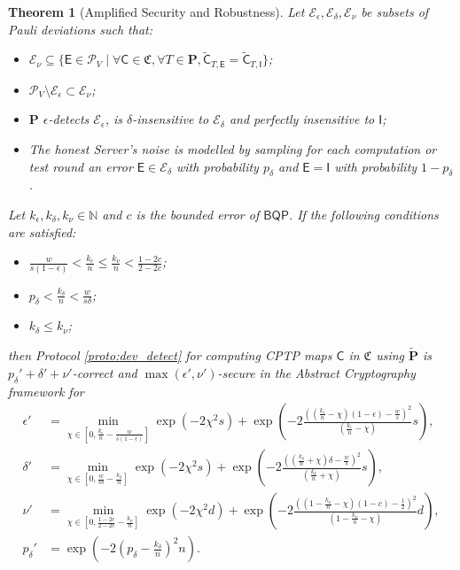 \documentclass[12pt]{iopart}
\newcommand{\cptp}[1]{\mathsf{#1}} \newcommand{\pd}[1]{\mathcal{#1}}  \newcommand{\sch}[1]{\bm{#1}}
\newcommand{\Id}{\cptp{I}}
\renewcommand{\1}{\mathds{1}}
\newcommand{\Cdev}[1]{\tilde{\cptp C}_{T, #1}}
\newtheorem{theorem}{Theorem}
\begin{document}
\begin{theorem}[Amplified Security and Robustness]
\noindent Let $\mathcal E_\epsilon, \mathcal E_\delta, \mathcal{E}_\nu$ be subsets of Pauli deviations such that:
  \begin{itemize}
  \item $\mathcal{E}_\nu \subseteq \{\cptp E \in \mathcal{P}_V \mid \forall \cptp C \in \mathfrak{C}, \forall T \in \sch P, \Cdev{\cptp E} = \Cdev{\cptp \Id}\}$;
  \item $\mathcal{P}_V \setminus \mathcal E_\epsilon \subset \mathcal{E}_\nu$;
  \item $\sch P$ $\epsilon$-detects $\mathcal E_\epsilon$, is $\delta$-insensitive to $\mathcal E_\delta$ and perfectly insensitive to $\Id$;
  \item The honest Server's noise is modelled by sampling for each computation or test round an error $\cptp E \in \mathcal E_\delta$ with probability $p_\delta$ and $\cptp E = \Id$ with probability $1 - p_\delta$. 
  \end{itemize}
  Let $k_\epsilon, k_\delta, k_\nu \in \mathbb{N}$ and $c$ is the bounded error of $\mathsf{BQP}$. If the following conditions are satisfied:
  \begin{itemize}
  \item $\frac{w}{s(1 - \epsilon)} < \frac{k_\epsilon}{n} \leq \frac{k_\nu}{n} < \frac{1 - 2c}{2 - 2c}$;
  \item $p_\delta < \frac{k_\delta}{n} < \frac{w}{s\delta}$;
  \item $k_\delta \leq k_\nu$;
  \end{itemize}
  then Protocol \ref{proto:dev_detect} for computing CPTP maps $\cptp C$ in $\mathfrak C$ using $\tilde{\sch P}$ is $p_\delta' + \delta' + \nu'$-correct and $\max(\epsilon', \nu')$-secure in the Abstract Cryptography framework for
  \begin{align}
  	\epsilon' &= \min_{\chi \in \left[ 0, \frac{k_\epsilon}{n} - \frac{w}{s(1-\epsilon)} \right]} \exp \left( -2 \chi^2 s \right) + \exp \left( -2 \frac{\left(\left( \frac{k_\epsilon}{n} - \chi \right)(1-\epsilon) - \frac{w}{s}\right)^2}{\left( \frac{k_\epsilon}{n} - \chi \right)} s\right),\\
  	\delta' &= \min_{\chi \in \left[ 0, \frac{w}{s\delta} - \frac{k_\delta}{n} \right]} \exp \left( -2 \chi^2 s \right) + \exp \left( -2 \frac{\left(\left( \frac{k_\delta}{n} + \chi \right)\delta - \frac{w}{s}\right)^2}{\left( \frac{k_\delta}{n} + \chi \right)} s\right),\\
  	\nu' &= \min_{\chi \in \left[ 0, \frac{1 - 2c}{2 - 2c} - \frac{k_\nu}{n} \right]} \exp(-2\chi^2 d) + \exp(- 2\frac{\left(\left(1 - \frac{k_\nu}{n} - \chi\right)(1 - c) - \frac{1}{2}\right)^2}{\left(1 - \frac{k_\nu}{n} - \chi\right)}d),\\
  	p_\delta' &= \exp\left(- 2\left(p_\delta - \frac{k_\delta}{n}\right)^2 n\right).
  \end{align}
\end{theorem}
\end{document}
